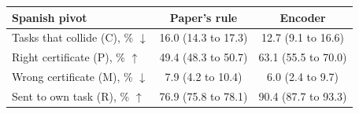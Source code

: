 \begin{tabular}{lcc}
    \toprule
    Spanish pivot & Paper's rule & Encoder \\
    \midrule
    Tasks that collide (\textsf{C}), \% $\downarrow$ & 16.0 (14.3 to 17.3) & 12.7 (9.1 to 16.6) \\
    Right certificate (\textsf{P}), \% $\uparrow$ & 49.4 (48.3 to 50.7) & 63.1 (55.5 to 70.0) \\
    Wrong certificate (\textsf{M}), \% $\downarrow$ & 7.9 (4.2 to 10.4) & 6.0 (2.4 to 9.7) \\
    Sent to own task (\textsf{R}), \% $\uparrow$ & 76.9 (75.8 to 78.1) & 90.4 (87.7 to 93.3) \\
    \bottomrule
\end{tabular}
